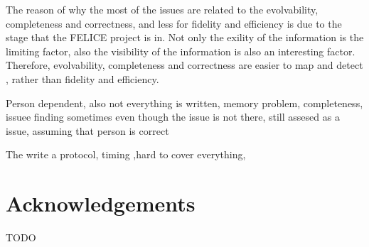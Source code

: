 \documentclass{llncs}
\begin{document}
    The reason of why the  most of the issues are related to the evolvability, 
    completeness and correctness, and less for fidelity and efficiency is due to the stage that the FELICE project is in. Not only the exility of the information is the limiting factor, also the visibility of the information 
    is also an interesting factor. Therefore, evolvability, completeness and correctness are easier to map and detect , rather than fidelity and efficiency. 

    Person dependent, also not everything is written, memory problem, completeness, 
    issuee finding sometimes even though the issue is not there, still assesed as a issue, assuming that person is correct

    The write a protocol, timing ,hard to cover everything, 
    

    
    \section*{Acknowledgements}
    TODO

    
    
\end{document}
